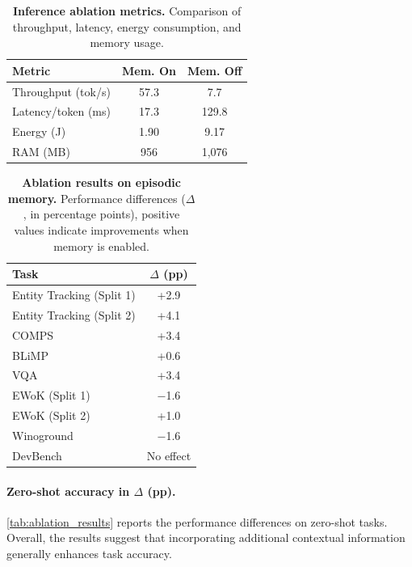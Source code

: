 \begin{table}[t]
    \centering
    \begin{tabular}{lcc}
        \hline
        \textbf{Metric} & \textbf{Mem. On} & \textbf{Mem. Off} \\ 
        \hline
        Throughput (tok/s) & 57.3 & 7.7 \\
        Latency/token (ms) & 17.3 & 129.8 \\
        Energy (J) & 1.90 & 9.17 \\
        RAM (MB) & 956 & 1,076 \\
        \hline
    \end{tabular}
    \caption{\textbf{Inference ablation metrics.}
    Comparison of throughput, latency, energy consumption, and memory usage.
    }
    \label{tab:inference_ablation_metrics}
\end{table}
\vspace{-4pt}
\begin{table}[t]
    \centering
     \begin{tabular}{lc}
        \hline
        \textbf{Task} & \textbf{$\Delta$ (pp)} \\ 
        \hline
        Entity Tracking (Split 1) & +2.9 \\
        Entity Tracking (Split 2) & +4.1 \\
        COMPS & +3.4 \\
        BLiMP & +0.6 \\
        VQA & +3.4 \\
        EWoK (Split 1) & $-$1.6 \\
        EWoK (Split 2) & +1.0 \\
        Winoground & $-$1.6 \\
        DevBench & No effect \\
        \hline
    \end{tabular}
    \caption{\textbf{Ablation results on episodic memory.}
    Performance differences ($\Delta$, in percentage points), positive values indicate improvements when memory is enabled.
    }
\label{tab:ablation_results}
\end{table}


\paragraph{Zero-shot accuracy in $\Delta$ (pp).}
\autoref{tab:ablation_results} reports the performance differences on zero-shot tasks. Overall, the results suggest that incorporating additional contextual information generally enhances task accuracy.

